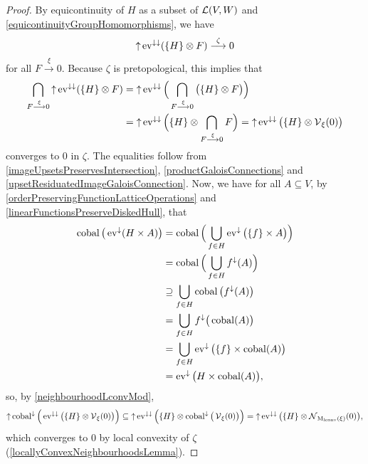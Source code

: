 \begin{proof}
By equicontinuity of $H$ as a subset of $\operatorname{\mathcal{L}}(V,W)$ and \ref{equicontinuityGroupHomomorphisms}, we have
\[ \operatorname{\uparrow} \operatorname{ev}^{\downarrow\downarrow}(\{H\}\otimes F) \overset{\zeta}{\longrightarrow} 0 \]
for all $F\overset{\xi}{\longrightarrow} 0$. Because $\zeta$ is pretopological, this implies that
\begin{align*}
\bigcap_{F\overset{\xi}{\longrightarrow} 0}\operatorname{\uparrow} \operatorname{ev}^{\downarrow\downarrow}(\{H\}\otimes F) &= \operatorname{\uparrow} \operatorname{ev}^{\downarrow\downarrow}\Big(\bigcap_{F\overset{\xi}{\longrightarrow} 0}\big(\{H\}\otimes F\big)\Big) \\
&= \operatorname{\uparrow}\operatorname{ev}^{\downarrow\downarrow}\Big(\{H\}\otimes \bigcap_{F\overset{\xi}{\longrightarrow} 0} F\Big) = \operatorname{\uparrow}\operatorname{ev}^{\downarrow\downarrow}\big(\{H\}\otimes \operatorname{\mathcal{V}}_\xi(0)\big)
\end{align*}
converges to $0$ in $\zeta$. The equalities follow from \ref{imageUpsetsPreservesIntersection}, \ref{productGaloisConnections} and \ref{upsetResiduatedImageGaloisConnection}.
Now, we have for all $A\subseteq V$, by \ref{orderPreservingFunctionLatticeOperations} and \ref{linearFunctionsPreserveDiskedHull}, that
\begin{align*}
\operatorname{cobal}\big(\operatorname{ev}^{\downarrow}(H\times A)\big) &= \operatorname{cobal}\Big(\bigcup_{f\in H}\operatorname{ev}^{\downarrow}\big(\{f\}\times A\big)\Big) \\
&= \operatorname{cobal}\Big(\bigcup_{f\in H}f^\downarrow(A)\Big) \\
&\supseteq \bigcup_{f\in H}\operatorname{cobal}\big(f^\downarrow(A)\big) \\
&= \bigcup_{f\in H}f^\downarrow\big(\operatorname{cobal}(A)\big) \\
&= \bigcup_{f\in H}\operatorname{ev}^\downarrow\big(\{f\}\times \operatorname{cobal}(A)\big) \\
&= \operatorname{ev}^{\downarrow}\big(H\times \operatorname{cobal}(A)\big),
\end{align*}
so, by \ref{neighbourhoodLconvMod},
\[ \operatorname{\uparrow}\operatorname{cobal}^\downarrow\Big(\operatorname{ev}^{\downarrow\downarrow}\big(\{H\}\otimes \operatorname{\mathcal{V}}_\xi(0)\big)\Big) \subseteq \operatorname{\uparrow} \operatorname{ev}^{\downarrow\downarrow}\Big(\{H\}\otimes \operatorname{cobal}^{\downarrow}\big(\operatorname{\mathcal{V}}_\xi(0)\big)\Big) = \operatorname{\uparrow} \operatorname{ev}^{\downarrow\downarrow}\big(\{H\}\otimes \operatorname{\mathcal{N}}_{\operatorname{M_\text{lconv}}(\xi)}(0)\big), \]
which converges to $0$ by local convexity of $\zeta$ (\ref{locallyConvexNeighbourhoodsLemma}).
\end{proof}

